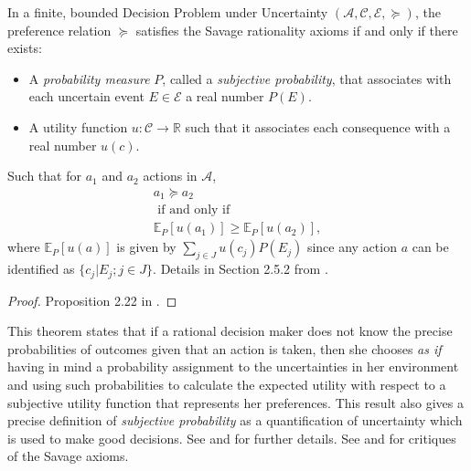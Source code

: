 \documentclass{svjour3}                     %
\begin{document}
\begin{theorem}[Savage]{\label{savage}}
In a finite, bounded Decision Problem under Uncertainty $(\mathcal{A}, \mathcal{C}, \mathcal{E}, \succeq)$, the preference relation $\succeq$ satisfies the Savage rationality axioms if and only if there exists: 
\begin{itemize}
\item A \textit{probability measure} $P$, called a \textit{subjective probability}, that associates with each uncertain event $E \in \mathcal{E}$ a real number $P(E)$. 
\item A utility function $u : \mathcal{C} \to \mathbb{R}$ such that it associates each consequence with a real number $u(c)$. 
\end{itemize}
Such that for $a_1$ and $a_2$ actions in $\mathcal{A}$,
\begin{eqnarray*}
 &a_1 \succeq a_2&\\
 & \textrm{ if and only if }&\\
 &\mathbb{E}_P[u(a_1)] \geq  \mathbb{E}_P[u(a_2)],&
\end{eqnarray*}
where $\mathbb{E}_P[u(a)]$ is given by $\sum_{j \in J} u(c_j) P(E_j)$ since any action $a$ can be identified as $\{ c_j | E_j ; j \in J \}.$ Details in Section 2.5.2 from \cite{bernardo2000bayesian}.
\end{theorem}
\begin{proof}
Proposition 2.22 in \cite{bernardo2000bayesian}.
\end{proof}
This theorem states that if a rational decision maker does not know the precise probabilities of outcomes given that an action is taken, then she chooses \textit{as if} having in mind a probability assignment to the uncertainties in her environment and using such probabilities to calculate the expected utility with respect to a subjective utility function that represents her preferences. This result also gives a precise definition of \textit{subjective probability} as a quantification of uncertainty which is used to make good decisions. See \cite{hens1992note} and \cite{gilboa2009decision} for further details. See \cite{ellsberg1961risk} and \cite{binmore2008rational} for critiques of the Savage axioms. 
\end{document}
